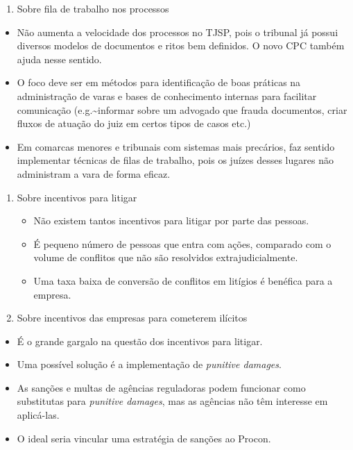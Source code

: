 \documentclass[]{report}
\providecommand{\tightlist}{%
  \setlength{\itemsep}{0pt}\setlength{\parskip}{0pt}}
\begin{document}
\begin{enumerate}
\def\labelenumi{\arabic{enumi}.}
\tightlist
\item
  Sobre fila de trabalho nos processos
\end{enumerate}

\begin{itemize}
\tightlist
\item
  Não aumenta a velocidade dos processos no TJSP, pois o tribunal já
  possui diversos modelos de documentos e ritos bem definidos. O novo
  CPC também ajuda nesse sentido.
\item
  O foco deve ser em métodos para identificação de boas práticas na
  administração de varas e bases de conhecimento internas para facilitar
  comunicação (e.g.\textasciitilde{}informar sobre um advogado que
  frauda documentos, criar fluxos de atuação do juiz em certos tipos de
  casos etc.)
\item
  Em comarcas menores e tribunais com sistemas mais precários, faz
  sentido implementar técnicas de filas de trabalho, pois os juízes
  desses lugares não administram a vara de forma eficaz.
\end{itemize}

\begin{enumerate}
\def\labelenumi{\arabic{enumi}.}
\tightlist
\item
  Sobre incentivos para litigar

  \begin{itemize}
  \tightlist
  \item
    Não existem tantos incentivos para litigar por parte das pessoas.
  \item
    É pequeno número de pessoas que entra com ações, comparado com o
    volume de conflitos que não são resolvidos extrajudicialmente.
  \item
    Uma taxa baixa de conversão de conflitos em litígios é benéfica para
    a empresa.
  \end{itemize}
\item
  Sobre incentivos das empresas para cometerem ilícitos
\end{enumerate}

\begin{itemize}
\tightlist
\item
  É o grande gargalo na questão dos incentivos para litigar.
\item
  Uma possível solução é a implementação de \emph{punitive damages}.
\item
  As sanções e multas de agências reguladoras podem funcionar como
  substitutas para \emph{punitive damages}, mas as agências não têm
  interesse em aplicá-las.
\item
  O ideal seria vincular uma estratégia de sanções ao Procon.
\end{itemize}
\end{document}
